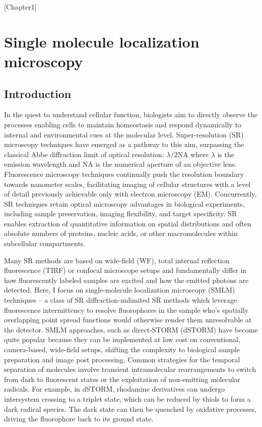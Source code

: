 [Chapter1]

\chapter{Single molecule localization microscopy}

\section{Introduction}

In the quest to understand cellular function, biologists aim to directly observe the processes enabling cells to maintain homeostasis and respond dynamically to internal and environmental cues at the molecular level. Super-resolution (SR) microscopy techniques have emerged as a pathway to this aim, surpassing the classical Abbe diffraction limit of optical resolution: $\lambda/2\mathrm{NA}$ where $\lambda$ is the emission wavelength and $\mathrm{NA}$ is the numerical aperture of an objective lens. Fluorescence microscopy techniques continually push the resolution boundary towards nanometer scales, facilitating imaging of cellular structures with a level of detail previously achievable only with electron microscopy (EM). Concurrently, SR techniques retain optical microscopy advantages in biological experiments, including sample preservation, imaging flexibility, and target specificity. SR enables extraction of quantitative information on spatial distributions and often absolute numbers of proteins, nucleic acids, or other macromolecules within subcellular compartments.

Many SR methods are based on wide-field (WF), total internal reflection fluorescence (TIRF) or confocal microscope setups and fundamentally differ in how fluorescently labeled samples are excited and how the emitted photons are detected. Here, I focus on single-molecule localization microscopy (SMLM) techniques – a class of SR diffraction-unlimited SR methods which leverage fluorescence intermittency to resolve fluorophores in the sample who’s spatially overlapping point spread functions would otherwise render them unresolvable at the detector. SMLM approaches, such as direct-STORM (dSTORM) have become quite popular because they can be implemented at low cost on conventional, camera-based, wide-field setups, shifting the complexity to biological sample preparation and image post processing. Common strategies for the temporal separation of molecules involve transient intramolecular rearrangements to switch from dark to fluorescent states or the exploitation of non-emitting molecular radicals. For example, in dSTORM, rhodamine derivatives can undergo intersystem crossing to a triplet state, which can be reduced by thiols to form a dark radical species. The dark state can then be quenched by oxidative processes, driving the fluorophore back to its ground state. 

